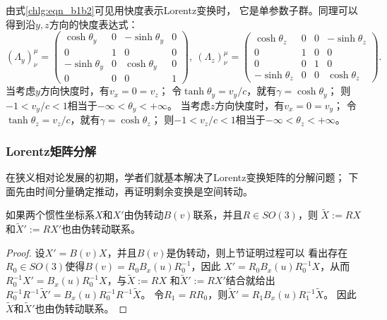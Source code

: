 由式\eqref{chlg:eqn_b1b2}可见用快度表示Lorentz变换时，
它是单参数子群。同理可以得到沿$y,z$方向的快度表达式：
\begin{equation*}
    (\Lambda_y)^{\mu}_{\nu} =
    \begin{pmatrix}
        \cosh\theta_y  & 0 & -\sinh\theta_y & 0 \\
        0 & 1  & 0 & 0 \\
        -\sinh\theta_y & 0 & \cosh\theta_y & 0 \\
        0 & 0 & 0 & 1
    \end{pmatrix},\
    (\Lambda_z)^{\mu}_{\nu} =
    \begin{pmatrix}
        \cosh\theta_z  & 0 & 0 & -\sinh\theta_z \\
        0 & 1  & 0 & 0 \\
        0 & 0 & 1 & 0 \\
        -\sinh\theta_z & 0 & 0 & \cosh\theta_z
    \end{pmatrix} .
\end{equation*}
当考虑$y$方向快度时，有$v_x=0=v_z$；
令$\tanh \theta_y=v_y/c$，就有$\gamma = \cosh \theta_y$；
则$-1<v_y/c<1$相当于$-\infty < \theta_y <+\infty$。
当考虑$z$方向快度时，有$v_x=0=v_y$；
令$\tanh \theta_z=v_z/c$，就有$\gamma = \cosh \theta_z$；
则$-1<v_z/c<1$相当于$-\infty < \theta_z <+\infty$。

\subsubsection{Lorentz矩阵分解}
在狭义相对论发展的初期，学者们就基本解决了Lorentz变换矩阵的分解问题；
下面先由时间分量确定推动，再证明剩余变换是空间转动。

\begin{proposition}
    如果两个惯性坐标系$X$和$X'$由伪转动$B(v)$联系，并且$R\in SO(3)$，则
    $\tilde{X} := RX$和$\tilde{X}' := RX'$也由伪转动联系。
\end{proposition}
\begin{proof}
    设$X'=B(v)X$，并且$B(v)$是伪转动，则上节证明过程可以
    看出存在$R_0\in SO(3)$使得$B(v)=R_0B_x(u)R_0^{-1}$，因此
    $X'=R_0B_x(u)R_0^{-1}X$，从而$R_0^{-1}X'=B_x(u)R_0^{-1}X$，与$\tilde{X} := RX$
    和$\tilde{X}' := RX'$结合就给出$R_0^{-1}R^{-1}\tilde{X}'=B_x(u)R_0^{-1}R^{-1}\tilde{X}$。
    令$R_1 = RR_0$，则$\tilde{X}'=R_{1}B_x(u)R_1^{-1}\tilde{X}$。
    因此$\tilde{X}$和$\tilde{X}'$也由伪转动联系。
\end{proof}

